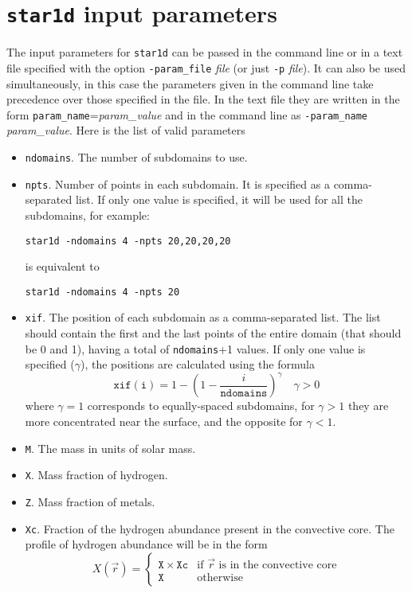 \section{{\tt star1d} input parameters}
The input parameters for {\tt star1d} can be passed in the command line or in a text file
specified with the option {\tt -param\_file} {\it file} (or just {\tt -p} {\it file}). It
can also be used simultaneously, in this case the parameters given in the command line take
precedence over those specified in the file. In the text file they are written in the 
form {\tt param\_name}={\it param\_value} and in the command line as 
{\tt -param\_name} {\it param\_value}.
Here is the list of valid parameters 
\begin{itemize}
\item {\tt ndomains}. The number of subdomains to use.
\item {\tt npts}. Number of points in each subdomain. It is specified as a 
comma-separated list. 
If only one value is specified, it will be used for all the subdomains, for example:
\begin{verbatim}
star1d -ndomains 4 -npts 20,20,20,20
\end{verbatim}
is equivalent to
\begin{verbatim}
star1d -ndomains 4 -npts 20
\end{verbatim}
\item {\tt xif}. The position of each subdomain as a comma-separated list. The list
should contain the first and the last points of the entire domain (that should be 0 and 1),
having a total of {\tt ndomains}+1 values. If only one value is specified ($\gamma$),
 the positions are calculated using the formula
$$\mathtt{xif(i)}=1-\left(1-\frac{i}{\mathtt{ndomains}}\right)^\gamma \quad \gamma>0$$
where $\gamma=1$ corresponds to equally-spaced subdomains, for $\gamma>1$ they are more
concentrated near the surface, and the opposite for $\gamma<1$. 
\item {\tt M}. The mass in units of solar mass.
\item {\tt X}. Mass fraction of hydrogen.
\item {\tt Z}. Mass fraction of metals.
\item {\tt Xc}. Fraction of the hydrogen abundance present in the convective core. The profile
of hydrogen abundance will be in the form
$$X(\vec r)=\left\{
\begin{array}{ll}
\mathtt{X}\times \mathtt{Xc}&\mbox{if $\vec r$ is in the convective core}\\
\mathtt{X}&\mbox{otherwise}

\end{array}$$
\end{itemize}
